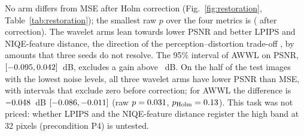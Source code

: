 

No arm differs from MSE after Holm correction (Fig.~\ref{fig:restoration},
Table~\ref{tab:restoration}); the smallest raw $p$ over the four metrics is
\restMinP{} (\restMinPHolm{} after correction). The wavelet arms lean towards
lower PSNR and better LPIPS and NIQE-feature distance, the direction of the
perception--distortion trade-off \citep{blau2018perception}, by amounts that
three seeds do not resolve. The 95\% interval of AWWL on PSNR,
$[-0.095, 0.042]$~dB, excludes a gain above
\restDPSNRAWWLHi~dB. On the half of the test images with the lowest noise
levels, all three wavelet arms have lower PSNR than MSE, with intervals that
exclude zero before correction; for AWWL the difference is
$-0.048$~dB $[-0.086, -0.011]$ (raw
$p = 0.031$, $p_{\mathrm{Holm}} = 0.13$). This
task was not priced: whether LPIPS and the NIQE-feature distance register the
high band at 32 pixels (precondition P4) is untested.
